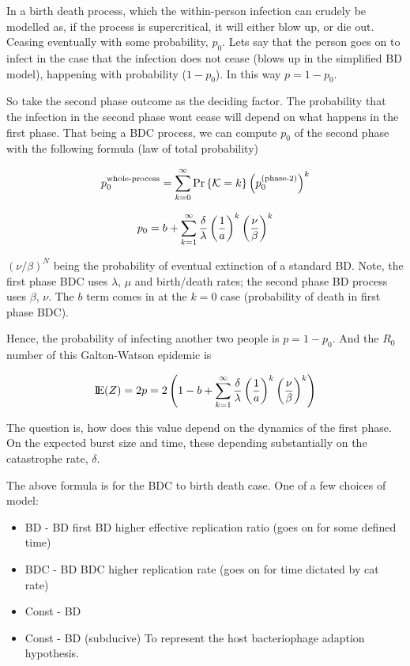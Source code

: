 In a birth death process, which the within-person infection can crudely be modelled as, if the process is supercritical, it will either blow up, or die out. Ceasing eventually with some probability, $p_0$. Lets say that the person goes on to infect in the case that the infection does not cease (blows up in the simplified BD model), happening with probability ($1-p_0$). In this way $p = 1-p_0$.\par

So take the second phase outcome as the deciding factor. The probability that the infection in the second phase wont cease will depend on what happens in the first phase. That being a BDC process, we can compute $p_0$ of the second phase with the following formula (law of total probability)

$$p^{\text{whole-process}}_0 = \sum^{\infty}_{k=0} {\text{Pr}\left\{\mathcal{K} = k\right\}} \left( p_0^{(\text{phase-2})}\right)^k$$ 

$$p_0 = b + \sum^{\infty}_{k=1} \frac{\delta}{\lambda} \left(\frac{1}{a}\right)^{k} \left(\frac{\nu}{\beta}\right)^k$$ 


$(\nu/\beta)^N$ being the probability of eventual extinction of a standard BD. Note, the first phase BDC uses $\lambda$, $\mu$ and birth/death rates; the second phase BD process uses $\beta$, $\nu$. The $b$ term comes in at the $k=0$ case (probability of death in first phase BDC). \par
Hence, the probability of infecting another two people is $p = 1-p_0$. And the $R_0$ number of this Galton-Watson epidemic is

$$ {\rm I}\!{\rm E}(Z) = 2p = 2\left(1 -  b + \sum^{\infty}_{k=1} \frac{\delta}{\lambda} \left(\frac{1}{a}\right)^{k} \left(\frac{\nu}{\beta}\right)^k\right) $$


The question is, how does this value depend on the dynamics of the first phase. On the expected burst size and time, these depending substantially on the catastrophe rate, $\delta$. 


The above formula is for the BDC to birth death case.  One of a few choices of model:

\begin{itemize}
\item BD - BD
first BD higher effective replication ratio (goes on for some defined time)
\item BDC - BD
BDC higher replication rate (goes on for time dictated by cat rate)
\item Const - BD
\item Const - BD (subducive) To represent the host bacteriophage adaption hypothesis. 
\end{itemize}

